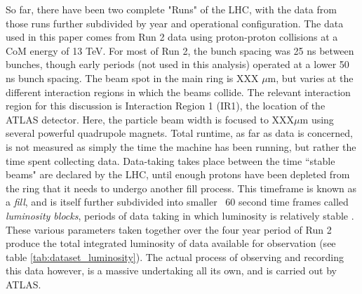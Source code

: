     

    So far, there have been two complete "Runs" of the LHC, with the data from those runs further subdivided by year and operational configuration.
    The data used in this paper comes from Run 2 data using proton-proton collisions at a CoM energy of 13 TeV.
    For most of Run 2, the bunch spacing was 25 ns between bunches, though early periods (not used in this analysis) operated at a lower 50 ns bunch spacing.
    The beam spot in the main ring is XXX $\mu$m, but varies at the different interaction regions in which the beams collide.
    The relevant interaction region for this discussion is Interaction Region 1 (IR1), the location of the ATLAS detector.
    Here, the particle beam width is focused to XXX$\mu$m using several powerful quadrupole magnets.
    Total runtime, as far as data is concerned, is not measured as simply the time the machine has been running, but rather the time spent collecting data.
    Data-taking takes place between the time ``stable beams" are declared by the LHC, until enough protons have been depleted from the ring that it needs to undergo another fill process.
    This timeframe is known as a \textit{fill}, and is itself further subdivided into smaller ~60 second time frames called \textit{luminosity blocks}, periods of data taking in which luminosity is relatively stable \cite{data_quality}.
    These various parameters taken together over the four year period of Run 2 produce the total integrated luminosity of data available for observation (see table \ref{tab:dataset_luminosity}).
    The actual process of observing and recording this data however, is a massive undertaking all its own, and is carried out by ATLAS.

